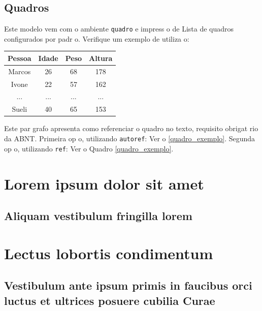 \documentclass{article}
\begin{document}
\section{Quadros}

Este modelo vem com o ambiente \texttt{quadro} e impress o de Lista de quadros 
configurados por padr o. Verifique um exemplo de utiliza o:

\begin{quadro}[htb]
\caption{\label{quadro_exemplo}Exemplo de quadro}
\begin{tabular}{|c|c|c|c|}
	\hline
	\textbf{Pessoa} & \textbf{Idade} & \textbf{Peso} & \textbf{Altura} \\ \hline
	Marcos & 26    & 68   & 178    \\ \hline
	Ivone  & 22    & 57   & 162    \\ \hline
	...    & ...   & ...  & ...    \\ \hline
	Sueli  & 40    & 65   & 153    \\ \hline
\end{tabular}
\end{quadro}

Este par grafo apresenta como referenciar o quadro no texto, requisito
obrigat rio da ABNT. 
Primeira op o, utilizando \texttt{autoref}: Ver o \autoref{quadro_exemplo}. 
Segunda op o, utilizando  \texttt{ref}: Ver o Quadro \ref{quadro_exemplo}.


\chapter{Lorem ipsum dolor sit amet}

\section{Aliquam vestibulum fringilla lorem}

\lipsum[1]

\lipsum[2-3]

\chapter{Lectus lobortis condimentum}

\section{Vestibulum ante ipsum primis in faucibus orci luctus et ultrices
posuere cubilia Curae}
\end{document}
